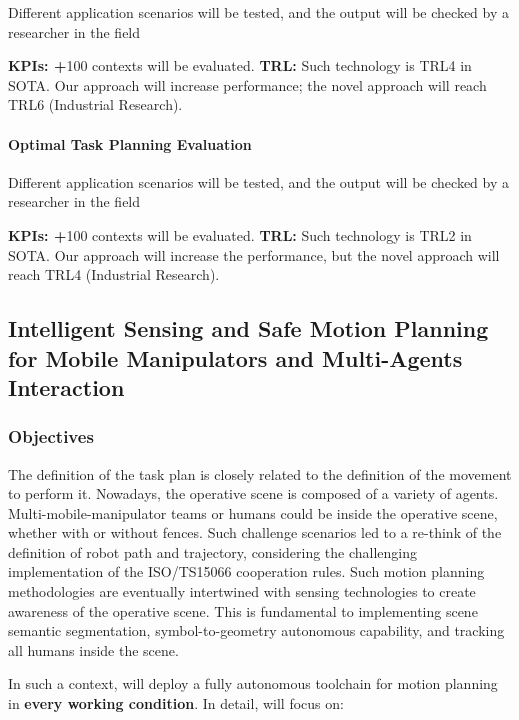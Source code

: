 Different application scenarios will be tested, and the output will be
checked by a researcher in the field

\textbf{KPIs: +}100 contexts will be evaluated. \textbf{\textbar{} TRL:}
Such technology is TRL4 in SOTA. Our approach will increase performance;
the novel approach will reach TRL6 (Industrial Research).

\paragraph{Optimal Task Planning
Evaluation}\label{optimal-task-planning-evaluation}

Different application scenarios will be tested, and the output will be
checked by a researcher in the field

\textbf{KPIs: +}100 contexts will be evaluated. \textbf{\textbar{} TRL:}
Such technology is TRL2 in SOTA. Our approach will increase the
performance, but the novel approach will reach TRL4 (Industrial
Research).

\subsection{Intelligent Sensing and Safe Motion Planning for Mobile
Manipulators and Multi-Agents
Interaction}\label{intelligent-sensing-and-safe-motion-planning-for-mobile-manipulators-and-multi-agents-interaction}

\subsubsection{\texorpdfstring{Objectives
}{Objectives }}\label{objectives-1}

The definition of the task plan is closely related to the definition of
the movement to perform it. Nowadays, the operative scene is composed of
a variety of agents. Multi-mobile-manipulator teams or humans could be
inside the operative scene, whether with or without fences. Such
challenge scenarios led to a re-think of the definition of robot path
and trajectory, considering the challenging implementation of the
ISO/TS15066 cooperation rules. Such motion planning methodologies are
eventually intertwined with sensing technologies to create awareness of
the operative scene. This is fundamental to implementing scene semantic
segmentation, symbol-to-geometry autonomous capability, and tracking all
humans inside the scene.

In such a context,  will deploy a fully autonomous
toolchain for motion planning in \textbf{every working condition}. In
detail,  will focus on:

